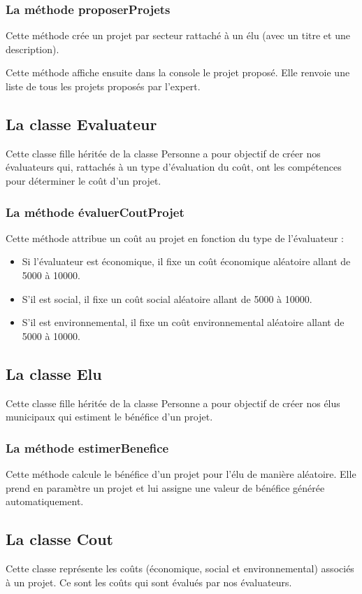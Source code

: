 \documentclass[11pt]{article}
\begin{document}
\subsubsection{La méthode proposerProjets}
Cette méthode crée un projet par secteur rattaché à un élu (avec un titre et une description).

Cette méthode affiche ensuite dans la console le projet proposé. Elle renvoie une liste de tous les projets proposés par l'expert. 

\subsection{La classe Evaluateur}
Cette classe fille héritée de la classe Personne a pour objectif de créer nos évaluateurs qui, rattachés à un type d’évaluation du coût, ont les compétences pour déterminer le coût d’un projet.

\subsubsection{La méthode évaluerCoutProjet}
Cette méthode attribue un coût  au projet en fonction du type de l’évaluateur : 
\begin{itemize}
	\item Si l'évaluateur est économique, il fixe un coût économique aléatoire allant de 5000 à 10000.
	\item S’il est social, il fixe un coût social aléatoire allant de 5000 à 10000.
	\item S'il est environnemental, il fixe un coût environnemental aléatoire allant de 5000 à 10000.
\end{itemize}

\subsection{La classe Elu}
Cette classe fille héritée de la classe Personne a pour objectif de créer nos élus municipaux qui estiment le bénéfice d’un projet.

\subsubsection{La méthode estimerBenefice}
Cette méthode calcule le bénéfice d’un projet pour l’élu de manière aléatoire. Elle prend en paramètre un projet et lui assigne une valeur de bénéfice générée automatiquement. 

\subsection{La classe Cout}
Cette classe représente les coûts (économique, social et environnemental) associés à un projet. Ce sont les coûts qui sont évalués par nos évaluateurs. 
\end{document}
